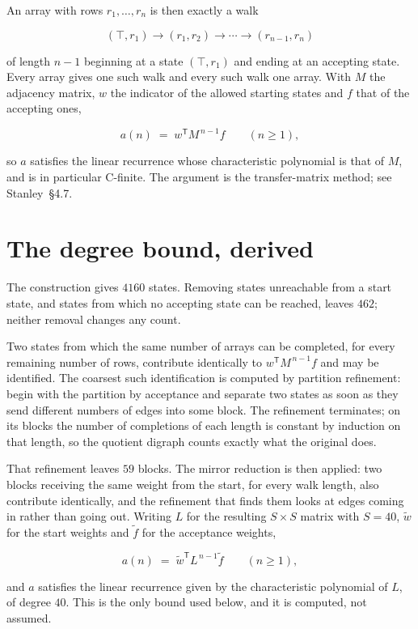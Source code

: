 \documentclass[11pt]{article}
\theoremstyle{definition}
\begin{document}
An array with rows $r_1,\dots,r_n$ is then exactly a walk

\[(\top,r_1) \to (r_1,r_2) \to \cdots \to (r_{n-1},r_n)\]

of length $n-1$ beginning at a state $(\top,r_1)$ and ending at an accepting state. Every array gives one such walk and every such walk one array. With $M$ the adjacency matrix, $w$ the indicator of the allowed starting states and $f$ that of the accepting ones,

\[a(n) \;=\; w^{\mathsf T} M^{\,n-1} f \qquad (n \ge 1),\]

so $a$ satisfies the linear recurrence whose characteristic polynomial is that of $M$, and is in particular C-finite. The argument is the transfer-matrix method; see Stanley~\S4.7.

\section{The degree bound, derived}

The construction gives $4160$ states. Removing states unreachable from a start state, and states from which no accepting state can be reached, leaves $462$; neither removal changes any count.

Two states from which the same number of arrays can be completed, for every remaining number of rows, contribute identically to $w^{\mathsf T}M^{\,n-1}f$ and may be identified. The coarsest such identification is computed by partition refinement: begin with the partition by acceptance and separate two states as soon as they send different numbers of edges into some block. The refinement terminates; on its blocks the number of completions of each length is constant by induction on that length, so the quotient digraph counts exactly what the original does.

That refinement leaves $59$ blocks. The mirror reduction is then applied: two blocks receiving the same weight from the start, for every walk length, also contribute identically, and the refinement that finds them looks at edges coming in rather than going out. Writing $L$ for the resulting $S \times S$ matrix with $S = 40$, $\tilde w$ for the start weights and $\tilde f$ for the acceptance weights,

\[a(n) \;=\; \tilde w^{\mathsf T} L^{\,n-1} \tilde f \qquad (n \ge 1),\]

and $a$ satisfies the linear recurrence given by the characteristic polynomial of $L$, of degree $40$. This is the only bound used below, and it is computed, not assumed.
\end{document}
